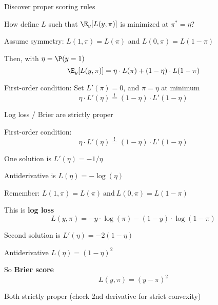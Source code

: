 \documentclass[11pt,compress,t,notes=noshow, xcolor=table]{beamer}
\begin{document}
\begin{frame}{Discover proper scoring rules}

\begin{itemizeL}

\item How define $L$ such that $\E_y[L(y, \pi)]$ is minimized at $\pi^{\ast}=\eta$? 

\item Assume symmetry: 
$L(1,\pi)=L(\pi)$ and $L(0,\pi)=L(1-\pi)$ \\

\end{itemizeL}

{}

\begin{itemizeL}
\item Then, with $\eta = \P(y = 1)$
$$\E_{y}[L(y, \pi)]=\eta \cdot L(\pi) + (1-\eta) \cdot L(1-\pi)$$
\item First-order condition: Set $L'(\pi) = 0$, and $\pi=\eta$ at minimum 
$$\eta \cdot L'(\eta) \overset{!}{=} (1-\eta) \cdot L'(1-\eta)$$

\end{itemizeL}
\end{frame}

\begin{framei}[sep=M]{Log loss / Brier are strictly proper}

    \item First-order condition: 
    $$\eta \cdot L'(\eta) \overset{!}{=} (1-\eta) \cdot L'(1-\eta)$$
    \item One solution is $L'(\eta)=-1/\eta$ %
    \item Antiderivative is $L(\eta)=-\log(\eta)$ 
    \item Remember: 
    $L(1, \pi) = L(\pi) \ \text{and} \ L(0, \pi) = L(1-\pi)$
    \item This is \textbf{log loss} 
    $$L(y, \pi)=-y \cdot \log(\pi) - (1-y) \cdot \log(1-\pi)$$

    \item Second solution is $L'(\eta)=-2(1-\eta)$%
    \item Antiderivative $L(\eta)=(1-\eta)^2$%
    \item So \textbf{Brier score} 
    $$L(y, \pi)=(y - \pi)^2$$
  

\item Both strictly proper (check 2nd derivative for strict convexity)


\end{framei}
\end{document}
